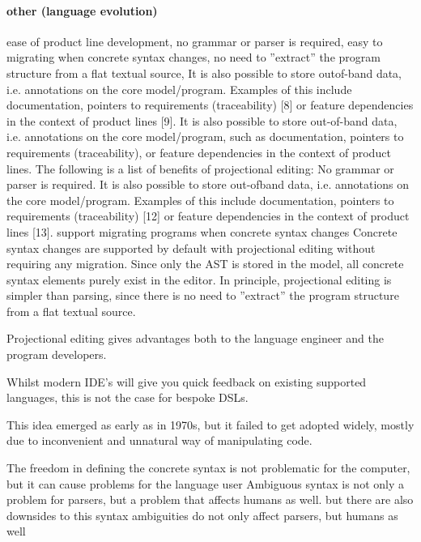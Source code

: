 \paragraph{other (language evolution)}
ease of product line development,  no grammar or parser is required,  easy to  migrating when concrete syntax changes, no need to ”extract” the program structure from a flat textual source,
It is also possible to store outof-band data, i.e. annotations on the core model/program.
Examples of this include documentation, pointers to requirements (traceability) [8] or feature dependencies in the context of product lines [9].
It is also possible to store out-of-band data, i.e. annotations on the core model/program, such as documentation, pointers to requirements (traceability), or feature dependencies in the context of product lines.
The following is a list of benefits of projectional editing:
 No grammar or parser is required.
 It is also possible to store out-ofband data, i.e. annotations on the core model/program.
 Examples of this include documentation, pointers to requirements (traceability) [12] or feature dependencies in the context of product lines [13].
 support migrating programs when concrete syntax changes Concrete syntax changes are supported by default with projectional editing without requiring any migration.
 Since only the AST is stored in the model, all concrete syntax elements purely exist in the editor.
 In principle, projectional editing is simpler than parsing, since there is no need to ”extract” the program structure from a flat textual source.
  

            


Projectional editing gives advantages both to the language engineer and the program developers.


Whilst modern IDE's will give you quick feedback on existing supported languages, this is not the case for bespoke DSLs.













This idea emerged as early as in 1970s, but it failed to get adopted widely, mostly due to inconvenient and unnatural way of manipulating code.

The freedom in defining the concrete syntax is not problematic for the computer, but it can cause problems for the language user 
Ambiguous syntax is not only a problem for parsers, but a problem that affects humans as well. 
but there are also downsides to this syntax ambiguities do not only affect parsers, but humans as well 

